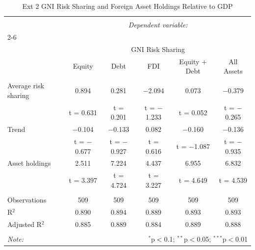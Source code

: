 
\begin{table}[!htbp] \centering 
  \caption{Ext 2 GNI Risk Sharing and Foreign Asset Holdings Relative to GDP} 
  \label{} 
\begin{tabular}{@{\extracolsep{5pt}}lccccc} 
\\[-1.8ex]\hline 
\hline \\[-1.8ex] 
 & \multicolumn{5}{c}{\textit{Dependent variable:}} \\ 
\cline{2-6} 
\\[-1.8ex] & \multicolumn{5}{c}{GNI Risk Sharing} \\ 
 & Equity & Debt & FDI & Equity + Debt & All Assets \\ 
\hline \\[-1.8ex] 
 Average risk sharing & 0.894 & 0.281 & $-$2.094 & 0.073 & $-$0.379 \\ 
  & t = 0.631 & t = 0.201 & t = $-$1.233 & t = 0.052 & t = $-$0.265 \\ 
  Trend & $-$0.104 & $-$0.133 & 0.082 & $-$0.160 & $-$0.136 \\ 
  & t = $-$0.677 & t = $-$0.927 & t = 0.616 & t = $-$1.087 & t = $-$0.935 \\ 
  Asset holdings & 2.511 & 7.224 & 4.437 & 6.955 & 6.832 \\ 
  & t = 3.397 & t = 4.724 & t = 3.227 & t = 4.649 & t = 4.539 \\ 
 \hline \\[-1.8ex] 
Observations & 509 & 509 & 509 & 509 & 509 \\ 
R$^{2}$ & 0.890 & 0.894 & 0.889 & 0.893 & 0.893 \\ 
Adjusted R$^{2}$ & 0.885 & 0.889 & 0.884 & 0.889 & 0.888 \\ 
\hline 
\hline \\[-1.8ex] 
\textit{Note:}  & \multicolumn{5}{r}{$^{*}$p$<$0.1; $^{**}$p$<$0.05; $^{***}$p$<$0.01} \\ 
\end{tabular} 
\end{table} 
